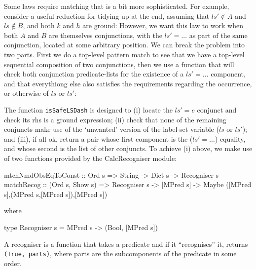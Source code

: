 Some laws require matching that is a bit more sophisticated.
For example,
consider a useful reduction for tidying up at the end,
assuming that $ls' \notin A$ and $ls \notin B$, and both $k$ and $h$
are ground:
However, we want this law to work when both $A$ 
and $B$ are themselves conjunctions, with the $ls'=\dots$
as part of the same conjunction, located at some arbitrary position.
We can break the problem into two parts.
First we do a top-level pattern match 
to see that we have a top-level sequential composition
of two conjunctions,
then we use a function that will check both conjunction predicate-lists
for the existence of a $ls'=\dots$ component,
and that everythiong else also satisfies the requirements regarding
the occurrence, or otherwise of $ls$ or $ls'$:
The function \texttt{isSafeLSDash}
is designed to 
(i) locate the $ls'=e$ conjunct and check its rhs is a ground expression;
(ii) check that none of the remaining conjuncts make use of the
`unwanted' version of the label-set variable ($ls$ or $ls'$);
and (iii), if all ok, return a pair
whose first component is the ($ls'=\dots$) equality,
and whose second is the list of other conjuncts.
To achieve (i) above,
we make use of two functions provided by the CalcRecogniser module:
\begin{code}
mtchNmdObsEqToConst :: Ord s => String -> Dict s -> Recogniser s
matchRecog :: (Ord s, Show s)
           => Recogniser s -> [MPred s]
           -> Maybe ([MPred s],(MPred s,[MPred s]),[MPred s])
\end{code}
where
\begin{code}
type Recogniser s = MPred s -> (Bool, [MPred s])
\end{code}
A recogniser is a function that takes a predicate
and if it ``recognises'' it, returns \texttt{(True, parts)},
where parts are the subcomponents of the predicate in some order.
